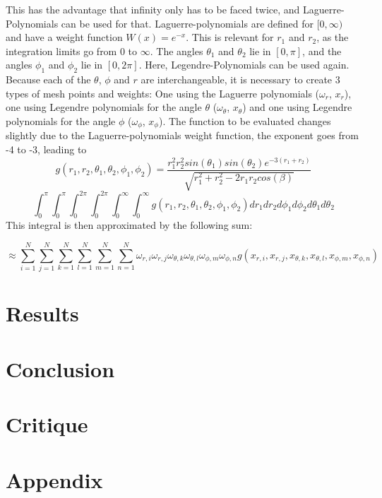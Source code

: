 \documentclass[10pt,a4paper]{article}
\begin{document}
This has the advantage that infinity only has to be faced twice, and Laguerre-Polynomials can be used for that. Laguerre-polynomials are defined for $[0,\infty)$ and have a weight function $W(x)=e^{-x}$. This is relevant for $r_1$ and $r_2$, as the integration limits go from $0$ to $\infty$. The angles $\theta_1$ and $\theta_2$ lie in $[0,\pi]$, and the angles $\phi_1$ and $\phi_2$  lie in $[0,2\pi]$. Here, Legendre-Polynomials can be used again. Because each of the $\theta$, $\phi$ and $r$ are interchangeable, it is necessary to create 3 types of mesh points and weights: One using the Laguerre polynomials  ($\omega_r$, $x_r$), one using Legendre polynomials for the angle $\theta$ ($\omega_\theta$, $x_\theta$) and one using Legendre polynomials for the angle $\phi$ ($\omega_\phi$, $x_\phi$). The function to be evaluated changes slightly due to the Laguerre-polynomials weight function, the exponent goes from -4 to -3, leading to
$$g(r_1,r_2,\theta_1,\theta_2,\phi_1,\phi_2)=\frac{r_1^2r_2^2sin(\theta_1)sin(\theta_2)e^{-3(r_1+r_2)}}{\sqrt{r_1^2+r_2^2-2r_1r_2cos(\beta)}}$$
$$\int_{0}^{\pi}\int_{0}^{\pi}\int_{0}^{2\pi}\int_{0}^{2\pi}\int_{0}^{\infty}\int_{0}^{\infty}
g(r_1,r_2,\theta_1,\theta_2,\phi_1,\phi_2)dr_1dr_2d\phi_1d\phi_2d\theta_1d\theta_2$$
This integral is then approximated by the following sum:

$$
\approx \sum_{i=1}^N \sum_{j=1}^N \sum_{k=1}^N \sum_{l=1}^N \sum_{m=1}^N \sum_{n=1}^N \omega_{r,i} \omega_{r,j} \omega_{\theta ,k} \omega_{\theta ,l} \omega_{\phi ,m} \omega_{\phi ,n} g(x_{r,i},x_{r,j},x_{\theta ,k},x_{\theta ,l},x_{\phi ,m},x_{\phi ,n})
$$

\section{Results}

\section{Conclusion}

\section{Critique}

\section{Appendix}
\end{document}
